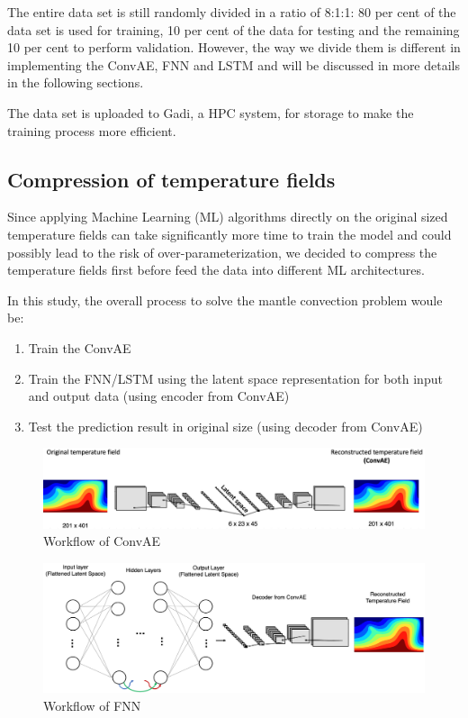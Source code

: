 The entire data set is still randomly divided in a ratio of 8:1:1: 80 per cent of the data set is used for training, 10 per cent of the data for testing and the remaining 10 per cent to perform validation. However, the way we divide them is different in implementing the ConvAE, FNN and LSTM and will be discussed in more details in the following sections.

The data set is uploaded to Gadi, a HPC system, for storage to make the training process more efficient. 

\subsection{Compression of temperature fields}

Since applying Machine Learning (ML) algorithms directly on the original sized temperature fields can take significantly more time to train the model and could possibly lead to the risk of over-parameterization, we decided to compress the temperature fields first before feed the data into different ML architectures.

In this study, the overall process to solve the mantle convection problem woule be: 

\begin{enumerate}
  \item Train the ConvAE
  \item Train the FNN/LSTM using the latent space representation for both input and output data (using encoder from ConvAE)
  \item Test the prediction result in original size (using decoder from ConvAE)
\end{enumerate}

\begin{figure}[H]
    \centering
    \caption{Workflow of ConvAE}
    \includegraphics[scale=0.3]{figures/mantle_convection_images/ConvAE_workflow.png}
\end{figure}

\begin{figure}[H]
    \centering
    \caption{Workflow of FNN}
    \includegraphics[scale=0.4]{figures/mantle_convection_images/FNN_workflow.png}
\end{figure}

